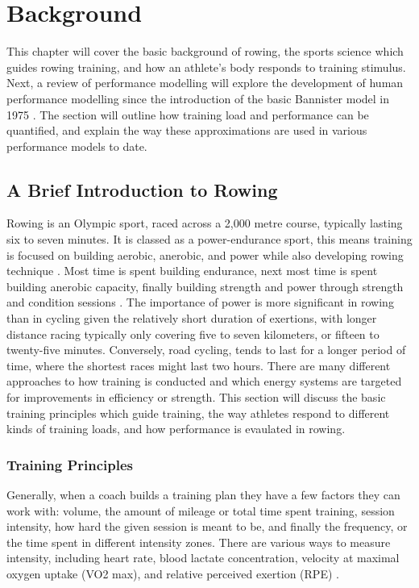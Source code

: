 \chapter{Background}
\label{ch:background}
This chapter will cover the basic background of rowing, the sports science which guides rowing training, and how an athlete's body responds to training stimulus. Next, a review of performance modelling will explore the development of human performance modelling since the introduction of the basic Bannister model in 1975 \autocite{Bannister1976}. The section will outline how training load and performance can be quantified, and explain the way these approximations are used in various performance models to date.

\section{A Brief Introduction to Rowing}
Rowing is an Olympic sport, raced across a 2,000 metre course, typically lasting six to seven minutes. It is classed as a power-endurance sport, this means training is focused on building aerobic, anerobic, and power while also developing rowing technique \autocite{Mäestu2005}. Most time is spent building endurance, next most time is spent building anerobic capacity, finally building strength and power through strength and condition sessions \autocite{Seiler2006}. The importance of power is more significant in rowing than in cycling given the relatively short duration of exertions, with longer distance racing typically only covering five to seven kilometers, or fifteen to twenty-five minutes. Conversely, road cycling, tends to last for a longer period of time, where the shortest races might last two hours. There are many different approaches to how training is conducted and which energy systems are targeted for improvements in efficiency or strength. This section will discuss the basic training principles which guide training, the way athletes respond to different kinds of training loads, and how performance is evaulated in rowing.

\subsection{\label{sub:training_principles}Training Principles}
Generally, when a coach builds a training plan they have a few factors they can work with: volume, the amount of mileage or total time spent training, session intensity, how hard the given session is meant to be, and finally the frequency, or the time spent in different intensity zones. There are various ways to measure intensity, including heart rate, blood lactate concentration, velocity at maximal oxygen uptake (VO2 max), and relative perceived exertion (RPE) \autocite{Rosenblat2019}. 


